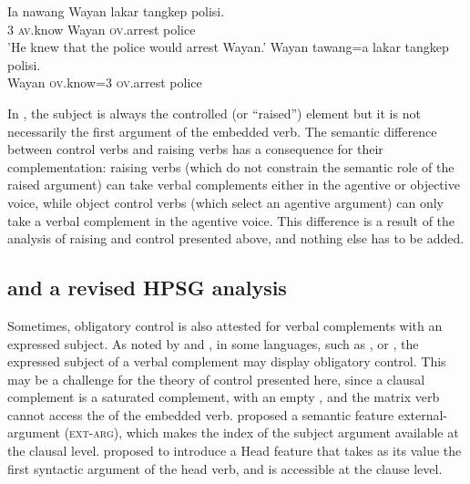 \ex
\label{ov}
\gll Ia nawang           Wayan lakar  tangkep            polisi.\\
     3  \textsc{av}.know Wayan \FUT{} \textsc{ov}.arrest police\\
\glt 'He knew that the police would arrest Wayan.'
\ex
\label{rais-ov}
\gll Wayan tawang=a           lakar  tangkep            polisi. \\
     Wayan \textsc{ov}.know=3 \FUT{} \textsc{ov}.arrest police\\ 
\zl


In , the subject is always the controlled (or ``raised'') element but it is not
necessarily the first argument of the embedded verb. The semantic difference between control verbs
and raising verbs has a consequence for their complementation: raising verbs (which do not constrain
the semantic role of the raised argument) can take verbal complements either in the agentive or
objective voice, while object control verbs (which select an agentive argument) can only take a
verbal complement in the agentive voice. This difference is a result of the analysis of raising and
control presented above, and nothing else has to be added.



\subsection{\xarg and a revised HPSG analysis}\label{section-xarg}


Sometimes, obligatory control is also attested for verbal complements with an expressed subject.  As
noted by \citet{Zec87a-u,Farkas1988} and \citet[--116]{GH2001a-u}, in some languages, such
as ,  \citep{Kuno76a-u,Iida96a-u} or  \citep{Karimi2008},
the expressed subject of a verbal complement may display obligatory control. This may be a challenge
for the theory of control presented here, since a clausal complement is a saturated complement, with
an empty \subjl, and the matrix verb cannot access the \subjv of the embedded verb. \citet[]{SP91a-u} proposed a semantic feature external-argument (\textsc{ext-arg}), which makes the index of the
subject argument available at the clausal level.  \citet{Sag2007a}\addpages proposed to introduce a Head
feature \xarg that takes as its value the first syntactic argument of the head verb, and is
accessible at the clause level.

